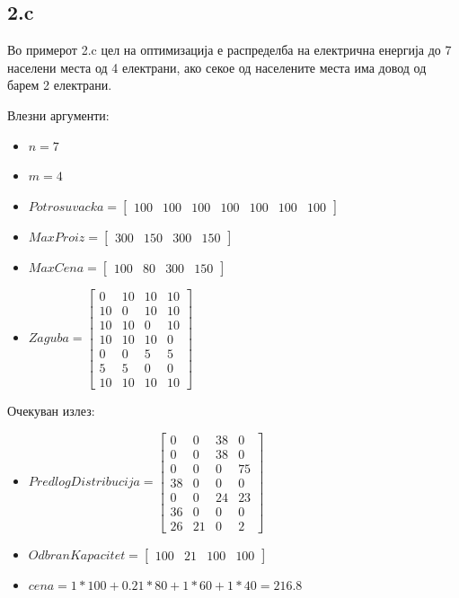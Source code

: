 \documentclass{article}
\begin{document}
\subsection{2.c}
Во примерот 2.c цел на оптимизација е распределба на електрична енергија до 7 населени места од 4 електрани, ако секое од населените места има довод од барем 2 електрани. 

Влезни аргументи:
\begin{itemize}
\item $n = 7$
\item $m = 4$
\item $Potrosuvacka = \begin{bmatrix} 100 & 100 & 100 & 100 & 100 & 100 & 100\end{bmatrix}$
\item $MaxProiz = \begin{bmatrix} 300 & 150 & 300 & 150\end{bmatrix}$
\item $MaxCena = \begin{bmatrix} 100 & 80 & 300 & 150 \end{bmatrix}$
\item $Zaguba = \begin{bmatrix} 0 & 10 & 10 & 10 \\ 10 & 0 & 10 & 10 \\ 10 & 10 & 0 & 10 \\ 10 & 10 & 10 & 0 \\ 0 & 0 & 5 & 5 \\ 5 & 5 & 0 & 0 \\ 10 & 10 & 10 & 10\end{bmatrix}$
\end{itemize}
Очекуван излез:
\begin{itemize}
\item $PredlogDistribucija = \begin{bmatrix} 0 & 0 & 38 & 0 \\ 0 & 0 & 38 & 0 \\ 0 & 0 & 0 & 75 \\ 38 & 0 & 0 & 0 \\ 0 & 0 & 24 & 23 \\ 36 & 0 & 0 & 0 \\ 26 & 21 & 0 & 2 \end{bmatrix}$
\item $OdbranKapacitet = \begin{bmatrix} 100 & 21 & 100 & 100 \end{bmatrix}$
\item $cena = 1 * 100 + 0.21 * 80 + 1 * 60 + 1 * 40 = 216.8$
\end{itemize}
\end{document}
